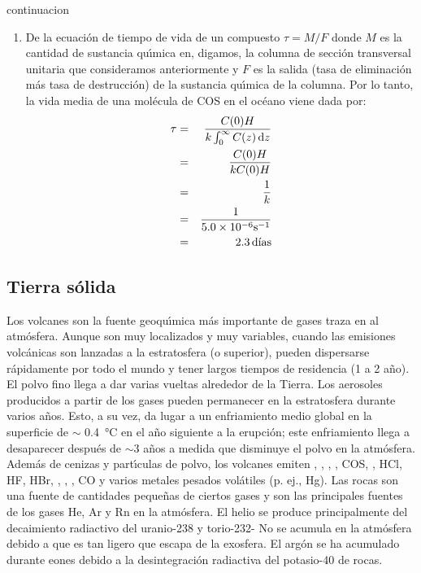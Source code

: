 \begin{ejemplo} {continuacion}
\begin{enumerate}
\begin{eqnarray*}
\textrm{Densidad de columna de COS} &=& \int_{z=0}^\infty C(z)\,\mathrm{d}z \\
       &=&  \int_{z=0}^\infty C(0)\exp\left(-\frac{z}{H}\right)\,\mathrm{d}z  \\
       &=& C(0)H \\
       &=& (1.0\times10^{-11})\times 32 \\
       &=& 3.2\times10^{-10}\si{\kilo\gram\per\square\metre}
\end{eqnarray*}
%
\item De la ecuaci\'on de tiempo de vida de un compuesto $\tau=M/F$
donde $M$ es la cantidad de sustancia qu\'{\i}mica en, digamos, la columna de secci\'on transversal unitaria que consideramos anteriormente y $F$ es la salida (tasa de eliminaci\'on m\'as tasa de destrucci\'on) de la sustancia qu\'{\i}mica de la columna. Por lo tanto, la vida media de una mol\'ecula de COS en el oc\'eano viene dada por:
\begin{eqnarray*}
\tau & = & \frac{C(0)H}{k\int_0^\infty C(z)\,\mathrm{d}z } \\
& =& \frac{C(0)H}{kC(0)H}  \\ 
& =& \frac{1}{k}  \\ 
&=& \frac{1}{5.0\times10^{-6} \si{\second}^{-1}}\\
&=& 2.3\, \textrm{d\'{\i}as} 
\end{eqnarray*}
\end{enumerate}
\end{ejemplo}
\subsection{Tierra s\'olida}
Los volcanes son la fuente geoqu\'{\i}mica m\'as importante de gases traza en al atm\'osfera. Aunque son muy localizados y muy variables, cuando las emisiones volc\'anicas son lanzadas a la estratosfera (o superior), pueden dispersarse r\'apidamente por todo el mundo y tener largos tiempos de residencia (1 a 2 a\~no). El polvo fino  llega a dar varias vueltas alrededor de la Tierra. Los aerosoles producidos a partir de los gases pueden permanecer en la estratosfera durante varios a\~nos. Esto, a su vez, da lugar a un enfriamiento medio global en la superficie de $\sim$ \SI{0.4}{\celsius} en el a\~no siguiente a la erupci\'on; este enfriamiento llega a desaparecer despu\'es de $\sim$3 a\~nos a medida que disminuye el polvo en la atm\'osfera. Adem\'as de cenizas y part\'{\i}culas de polvo, los volcanes emiten , , , , COS, , HCl, HF, HBr, , , , CO y varios metales pesados vol\'atiles (p. ej., Hg). Las rocas son una fuente de  cantidades peque\~nas de ciertos gases y son las principales fuentes de los gases He, Ar y Rn en la atm\'osfera. El helio se produce principalmente del decaimiento radiactivo del uranio-238 y torio-232- No se acumula en la atm\'osfera debido a que es tan ligero que escapa de la exosfera. El arg\'on se ha acumulado durante eones debido a la desintegraci\'on radiactiva del potasio-40 de rocas.

